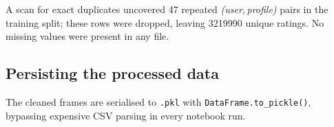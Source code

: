 A scan for exact duplicates uncovered \num{47} repeated
\textit{(user,\,profile)} pairs in the training split; these rows were
dropped, leaving \num{3219990} unique ratings.  
No missing values were present in any file.

\subsection*{Persisting the processed data}

The cleaned frames are serialised to \texttt{.pkl} with
\texttt{DataFrame.to\_pickle()}, bypassing expensive CSV parsing in every
notebook run.

